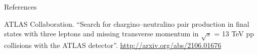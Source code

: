 \documentclass[UKenglish]{beamer}
\begin{document}
\begin{frame}{References}
    \begin{thebibliography}{}

        ATLAS Collaboration.
        \newblock \enquote{Search for chargino--neutralino pair production in final states with three leptons and missing transverse momentum in {$\sqrt{s}$} = 13 {TeV} pp collisions with the {ATLAS} detector}.
        \newblock \url{http://arxiv.org/abs/2106.01676}


    \end{thebibliography}
\end{frame}
\end{document}
